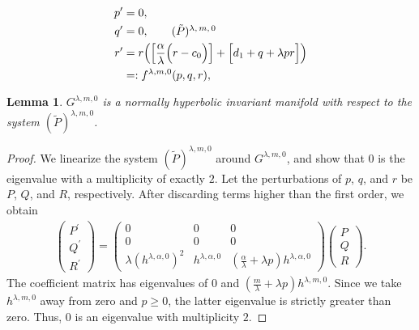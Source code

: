 \documentclass[a4paper,11pt]{article}
\newtheorem{lemma}{Lemma}[section]
\begin{document}
\begin{align}
 p^\prime &=0, \nonumber \\
 q^\prime &=0, \tag*{($\tilde{P}$)\textsuperscript{$\lambda,m,0$}}\label{eq:pqr_fast} \\%
 r^\prime&=r\Big( \Big[\frac{\alpha}{\lambda}\Big(r-c_0\Big)\Big]+\Big[d_1 + q + \lambda pr\Big]\Big)\nonumber \\
 &=:f^{\lambda,m,0}(p,q,r), \nonumber
\end{align}

\begin{lemma} \label{lem:normal_hyper}
 $G^{\lambda,m,0}$ is a normally hyperbolic invariant manifold with respect to the system $(\tilde{P})^{ \lambda,m,0}$.
\end{lemma}
\begin{proof}
We linearize the system $(\tilde{P})^{ \lambda,m,0}$ around $G^{\lambda,m,0}$, and show that $0$ is the eigenvalue with a multiplicity of exactly $2$. Let the perturbations of $p$, $q$, and $r$ be $P$, $Q$, and $R$, respectively. After discarding  terms higher than the first order, we obtain
\begin{align*}
 \begin{pmatrix} {P}^\prime\\ {Q}^\prime \\ {R}^\prime \end{pmatrix} =
 \begin{pmatrix} 0 & 0& 0\\ 0 & 0 & 0\\ \lambda (h^{\lambda,\alpha,0})^2 & h^{\lambda,\alpha,0} & ( \frac{\alpha}{ \lambda} + \lambda p )h^{\lambda,\alpha,0} \end{pmatrix} \begin{pmatrix} {P}\\ {Q} \\ {R} \end{pmatrix}.
\end{align*}
The coefficient matrix has eigenvalues of $0$ and $( \frac{m}{ \lambda} + \lambda p )h^{\lambda,m,0}$. Since we take $h^{\lambda,m,0}$ away from zero and $p \ge 0$, the latter eigenvalue is strictly greater than zero. Thus, $0$ is an eigenvalue with multiplicity $2$. %
\end{proof}
\end{document}
